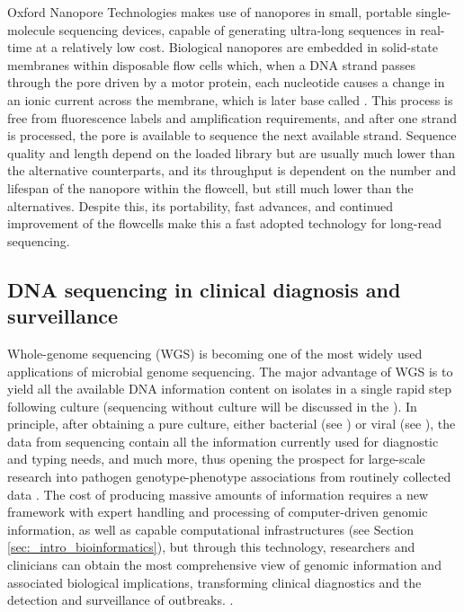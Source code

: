 Oxford Nanopore Technologies makes use of nanopores in small, portable single-molecule sequencing devices, capable of generating ultra-long sequences in real-time at a relatively low cost. 
Biological nanopores are embedded in solid-state membranes within disposable flow cells which, when a DNA strand passes through the pore driven by a motor protein, each nucleotide causes a change in an ionic current across the membrane, which is later base called \citep{hoang_long-reads-based_2022, loman_twenty_2015}. 
This process is free from fluorescence labels and amplification requirements, and after one strand is processed, the pore is available to sequence the next available strand. 
Sequence quality and length depend on the loaded library but are usually much lower than the alternative counterparts, and its throughput is dependent on the number and lifespan of the nanopore within the flowcell, but still much lower than the alternatives. 
Despite this, its portability, fast advances, and continued improvement of the flowcells make this a fast adopted technology for long-read sequencing.  

\subsection{DNA sequencing in clinical diagnosis and surveillance} \label{ssec:_intro_sequencing_diagnosis}

Whole-genome sequencing (WGS) is becoming one of the most widely used applications of microbial genome sequencing. 
The major advantage of WGS is to yield all the available DNA information content on isolates in a single rapid step following culture (sequencing without culture will be discussed in the ). 
In principle, after obtaining a pure culture, either bacterial (see ) or viral (see ), the data from sequencing contain all the information currently used for diagnostic and typing needs, and much more, thus opening the prospect for large-scale research into pathogen genotype-phenotype associations from routinely collected data \citep{didelot_transforming_2012}.
The cost of producing massive amounts of information requires a new framework with expert handling and processing of computer-driven genomic information, as well as capable computational infrastructures (see Section \ref{sec:_intro_bioinformatics}), but through this technology, researchers and clinicians can obtain the most comprehensive view of genomic information and associated biological implications, transforming clinical diagnostics and the detection and surveillance of outbreaks. \citep{cirulli_uncovering_2010, nature_reviews_genetics_genomic_2019, goodwin_coming_2016}.

